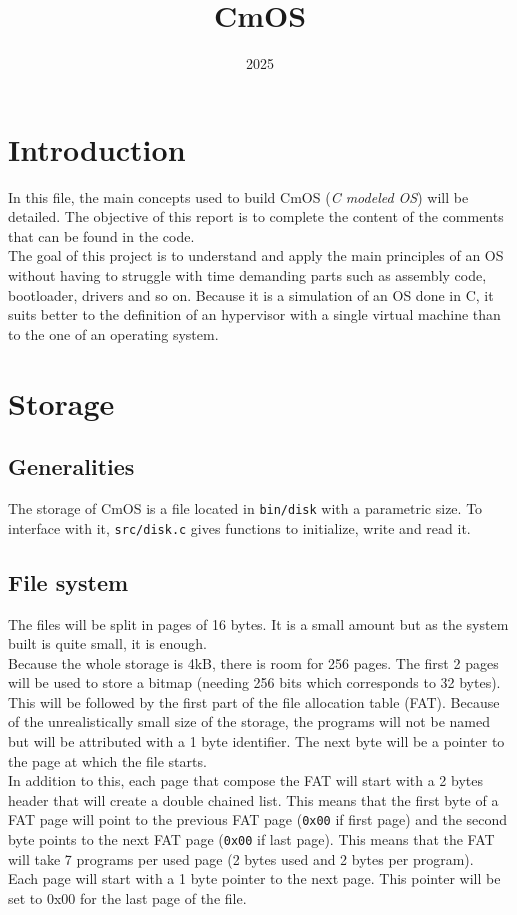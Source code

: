 \documentclass[a4paper,12pt]{article}
\title{CmOS}
\date{2025}
\begin{document}
\maketitle


\section{Introduction}

In this file, the main concepts used to build CmOS (\textit{C modeled OS}) will be detailed. The objective of this report is to complete the content of the comments that can be found in the code.\\
The goal of this project is to understand and apply the main principles of an OS without having to struggle with time demanding parts such as assembly code, bootloader, drivers and so on. Because it is a simulation of an OS done in C, it suits better to the definition of an hypervisor with a single virtual machine than to the one of an operating system.

\section{Storage}

\subsection{Generalities}

The storage of CmOS is a file located in \texttt{bin/disk} with a parametric size. To interface with it, \texttt{src/disk.c} gives functions to initialize, write and read it.

\subsection{File system}

The files will be split in pages of 16 bytes. It is a small amount but as the system built is quite small, it is enough. \\
Because the whole storage is 4kB, there is room for 256 pages. The first 2 pages will be used to store a bitmap (needing 256 bits which corresponds to 32 bytes).\\
This will be followed by the first part of the file allocation table (FAT). Because of the unrealistically small size of the storage, the programs will not be named but will be attributed with a 1 byte identifier. The next byte will be a pointer to the page at which the file starts. \\
In addition to this, each page that compose the FAT will start with a 2 bytes header that will create a double chained list. This means that the first byte of a FAT page will point to the previous FAT page (\texttt{0x00} if first page) and the second byte points to the next FAT page (\texttt{0x00} if last page). This means that the FAT will take 7 programs per used page (2 bytes used and 2 bytes per program).\\
Each page will start with a 1 byte pointer to the next page. This pointer will be set to 0x00 for the last page of the file.
\end{document}
